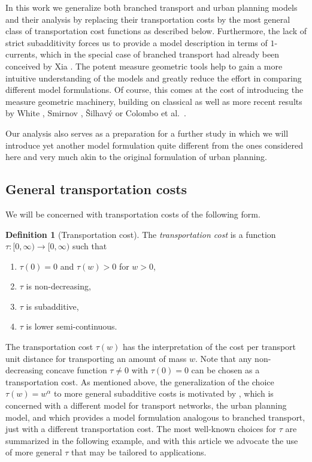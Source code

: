\documentclass[10pt,a4paper,oneside,final]{article}
\numberwithin{equation}{section}
\theoremstyle{plain}
\theoremstyle{definition}
\newtheorem{definition}[theorem]{Definition}
\theoremstyle{remark}
\newcommand{\notinclude}[1]{}
\begin{document}
In this work we generalize both branched transport and urban planning models and their analysis by replacing their transportation costs by the most general class of transportation cost functions as described below.
Furthermore, the lack of strict subadditivity forces us to provide a model description in terms of $1$-currents, which in the special case of branched transport had already been conceived by Xia \cite{Xia-Interior-Regularity}.
The potent measure geometric tools help to gain a more intuitive understanding of the models and greatly reduce the effort in comparing different model formulations.
Of course, this comes at the cost of introducing the measure geometric machinery, building on classical as well as more recent results by White \cite{Wh99b}, Smirnov \cite{Sm93}, \v{S}ilhav\'y \cite{Si07} or Colombo et al.\ \cite{CoRoMa17}.

Our analysis also serves as a preparation for a further study in which we will introduce yet another model formulation quite different from the ones considered here and very much akin to the original formulation of urban planning.


\subsection{General transportation costs}
We will be concerned with transportation costs of the following form.
\begin{definition}[Transportation cost]\label{def:transportation_cost}
The \emph{transportation cost} is a function $\tau : [0,\infty) \to [0,\infty)$ such that
\begin{enumerate}
 \item $\tau(0) = 0$ and $\tau(w)>0$ for $w>0$,
 \item $\tau$ is non-decreasing,
 \item $\tau$ is subadditive,
 \item $\tau$ is lower semi-continuous.
\end{enumerate}
\end{definition}

The transportation cost $\tau(w)$ has the interpretation of the cost per transport unit distance for transporting an amount of mass $w$.
Note that any non-decreasing concave function $\tau\neq0$ with $\tau(0)=0$ can be chosen as a transportation cost.
As mentioned above, the generalization of the \notinclude{branched transport }choice $\tau(w)=w^\alpha$ to more general subadditive costs is motivated by \cite{BrWi15-equivalent},
which is concerned with a different model for transport networks, the urban planning model, and which provides a model formulation analogous to branched transport, just with a different transportation cost.
The most well-known choices for $\tau$ are summarized in the following example, and with this article we advocate the use of more general $\tau$ that may be tailored to applications.
\end{document}
